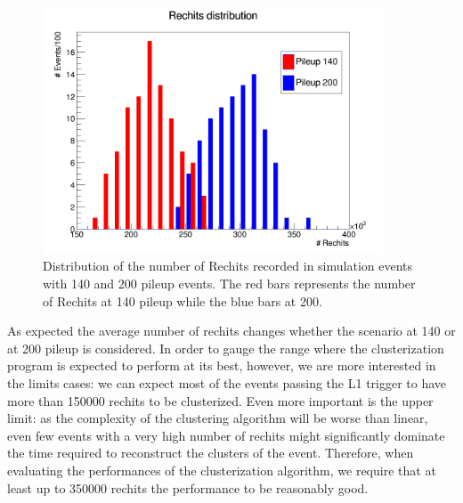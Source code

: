 \begin{figure}
\centerline{\includegraphics[width=0.9\textwidth]{intro/rechitsHisto.png}}
\caption{Distribution of the number of Rechits recorded in simulation events with 140 and 200 pileup events. The red bars represents the number of Rechits at 140 pileup while the blue bars at 200.}
\label{rechitsHisto}
\end{figure}

As expected the average number of rechits changes whether the scenario at 140 or at 200 pileup is considered. In order to gauge the range where the clusterization program is expected to perform at its best, however, we are more interested in the limits cases: we can expect most of the events passing the L1 trigger to have more than 150000 rechits to be clusterized. Even more important is the upper limit: as the complexity of the clustering algorithm will be worse than linear, even few events with a very high number of rechits might significantly dominate the time required to reconstruct the clusters of the event. Therefore, when evaluating the performances of the clusterization algorithm, we require that at least up to 350000 rechits the performance to be reasonably good.